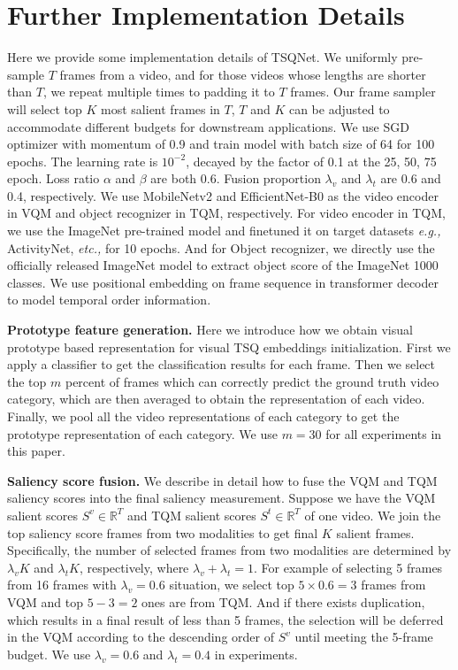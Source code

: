 \documentclass[runningheads]{llncs}
\begin{document}
\section{Further Implementation Details}\label{appendix:imp}
Here we provide some implementation details of TSQNet. 
We uniformly pre-sample $T$ frames from a video, and for those videos whose lengths are shorter than $T$, we repeat multiple times to padding it to $T$ frames.
Our frame sampler will select top $K$ most salient frames in $T$, 
$T$ and $K$ can be adjusted to accommodate different budgets for downstream applications. 
We use SGD optimizer with momentum of 0.9 and train model with batch size of 64 for 100 epochs. The learning rate is  $10^{-2}$, decayed by the factor of 0.1 at the 25, 50, 75 epoch. Loss ratio $\alpha$ and $\beta$ are both 0.6. Fusion proportion $\lambda_v$ and $\lambda_t$ are 0.6 and 0.4, respectively.
We use MobileNetv2 and EfficientNet-B0 as the video encoder in VQM and object recognizer in TQM, respectively. 
For video encoder in TQM, we use the ImageNet pre-trained model and finetuned it on target datasets \textit{e.g.,} ActivityNet, \emph{etc.,} for 10 epochs. And for Object recognizer, we directly use the officially released ImageNet model to extract object score of the ImageNet 1000 classes. We use positional embedding  on frame sequence in transformer decoder to model temporal order information.


\noindent \textbf{Prototype feature generation.}
Here we introduce how we obtain visual prototype based representation for visual TSQ embeddings initialization. 
First we apply a classifier to get the classification results for each frame. 
Then we select the top $m$ percent of frames which can correctly predict the ground truth video category, which are then averaged to obtain the representation of each video. 
Finally, we pool all the video representations of each category to get the prototype representation of each category.
We use $m = 30$ for all experiments in this paper.

\noindent \textbf{Saliency score fusion.}
We describe in detail how to fuse the VQM and TQM saliency scores into the final saliency measurement. Suppose we have the VQM salient scores $S^v \in \mathbb{R}^{T} $ and TQM salient scores $S^t \in \mathbb{R}^{T} $ of one video. We join the top saliency score frames from two modalities to get final $K$ salient frames. Specifically, the number of selected frames from two modalities are determined by  $\lambda_v K$ and $\lambda_t K$, respectively, where $\lambda_v + \lambda_t=1$.  
For example of selecting 5 frames from 16 frames with $\lambda_v=0.6$ situation, we select top $5 \times 0.6=3$ frames from VQM and top $5-3=2$ ones are from TQM. And if there exists duplication, which results in a final result of less than 5 frames, the selection will be deferred in the VQM according to the descending order of $S^v$ until meeting the 5-frame budget. We use $\lambda_v=0.6$ and $\lambda_t=0.4$ in experiments.
\end{document}
